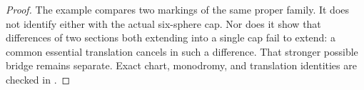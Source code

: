 \begin{proof}
The example compares two markings of the same
proper family. It does not identify either
with the actual six-sphere cap. Nor does it
show that differences of two sections both
extending into a single cap fail to extend:
a common essential translation cancels in
such a difference. That stronger possible
bridge remains separate. Exact chart,
monodromy, and translation identities are
checked in
.
\end{proof}

